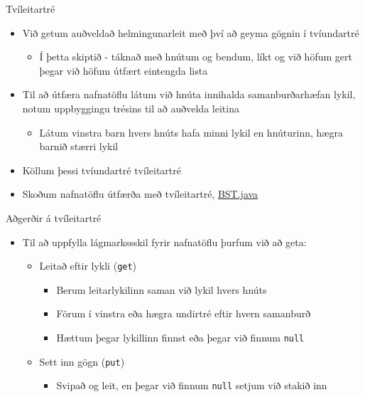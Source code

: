 \documentclass{beamer}
\begin{document}
\begin{frame}{Tvíleitartré}
	\begin{itemize}
		\item Við getum auðveldað helmingunarleit með því að geyma gögnin í tvíundartré 
		      \begin{itemize}
			      \item Í þetta skiptið - táknað með hnútum og bendum, líkt og við höfum gert þegar við höfum útfært eintengda lista
		      \end{itemize}
		\item Til að útfæra nafnatöflu látum við hnúta innihalda samanburðarhæfan lykil, notum uppbyggingu trésins til að auðvelda leitina
		      \begin{itemize}
			      \item Látum vinstra barn hvers hnúts hafa minni lykil en hnúturinn, hægra barnið stærri lykil
		      \end{itemize}
		\item Köllum þessi tvíundartré tvíleitartré 
		\item Skoðum nafnatöflu útfærða með tvíleitartré, \href{http://algs4.cs.princeton.edu/code/edu/princeton/cs/algs4/BST.java.html}{BST.java}
	\end{itemize}
\end{frame}

\begin{frame}{Aðgerðir á tvíleitartré}
	\begin{itemize}
		\item Til að uppfylla lágmarkssskil fyrir nafnatöflu þurfum við að geta:
		      \begin{itemize}
			      \item Leitað eftir lykli (\texttt{get})
			            \begin{itemize}
				            \item Berum leitarlykilinn saman við lykil hvers hnúts
				            \item Förum í vinstra eða hægra undirtré eftir hvern samanburð
				            \item Hættum þegar lykillinn finnst eða þegar við finnum \texttt{null}
			            \end{itemize}
			      \item Sett inn gögn (\texttt{put})
			            \begin{itemize}
				            \item Svipað og leit, en þegar við finnum \texttt{null} setjum við stakið inn
			            \end{itemize}
		      \end{itemize}
	\end{itemize}
\end{frame}
\end{document}
